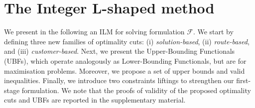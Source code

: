 \documentclass[11pt]{article}
\theoremstyle{definition}
\begin{document}

\section{The Integer L-shaped method}
\label{sec:algorithm2}

We present in the following an ILM for solving formulation $\mathscr{F}$. We start by defining three new families of optimality cuts: (i) \emph{solution-based}, (ii) \emph{route-based}, and (iii) \emph{customer-based}. Next, we present the Upper-Bounding Functionals (UBFs), which operate analogously as Lower-Bounding Functionals, but are for maximisation problems. Moreover, we propose a set of upper bounds and valid inequalities. Finally, we introduce two constraints liftings to strengthen our first-stage formulation.
We note that the proofs of validity of the proposed optimality cuts and UBFs are reported in the supplementary material.

%

\end{document}
